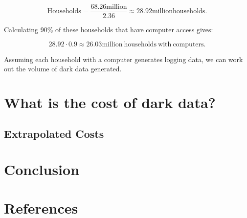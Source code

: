 \documentclass{article}
\begin{document}
\[
\mathrm{Households} = \frac{68.26 \mathrm{ million}}{2.36} \approx 28.92 \mathrm{ million households}.
\]

Calculating 90\% of these households that have computer access gives:

\[
28.92 \cdot 0.9 \approx 26.03 \mathrm{ million \ households \ with \ computers}.
\]

Assuming each household with a computer generates logging data, we can work out the volume of dark data generated.


\section{What is the cost of dark data?}

\subsection{Extrapolated Costs}

\section{Conclusion}

\section{References}
\printbibliography
\end{document}
